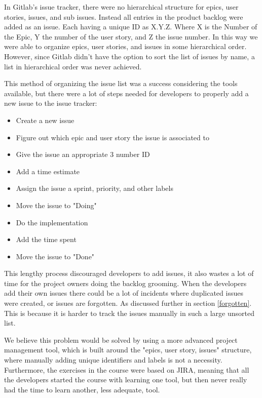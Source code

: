 \documentclass{article}
\begin{document}
In Gitlab's issue tracker, there were no hierarchical structure for epics, user stories, issues, and sub issues. Instead all entries in the product backlog were added as an issue. Each having a unique ID as X.Y.Z. Where X is the Number of the Epic, Y the number of the user story, and Z the issue number. In this way we were able to organize epics, user stories, and issues in some hierarchical order. However, since Gitlab didn't have the option to sort the list of issues by name, a list in hierarchical order was never achieved.

This method of organizing the issue list was a success considering the tools available, but there were a lot of steps needed for developers to properly add a new issue to the issue tracker:

\begin{itemize}
    \item Create a new issue
    \item Figure out which epic and user story the issue is associated to
    \item Give the issue an appropriate 3 number ID
    \item Add a time estimate
    \item Assign the issue a sprint, priority, and other labels
    \item Move the issue to "Doing"
    \item Do the implementation
    \item Add the time spent
    \item Move the issue to "Done"
\end{itemize}

This lengthy process discouraged developers to add issues, it also wastes a lot of time for the project owners doing the backlog grooming. When the developers add their own issues there could be a lot of incidents where duplicated issues were created, or issues are forgotten. As discussed further in section \ref{forgotten}. This is because it is harder to track the issues manually in such a large unsorted list.

We believe this problem would be solved by using a more advanced project management tool, which is built around the "epics, user story, issues" structure, where manually adding unique identifiers and labels is not a necessity. Furthermore, the exercises in the course were based on JIRA, meaning that all the developers started the course with learning one tool, but then never really had the time to  learn another, less adequate, tool.
\end{document}
